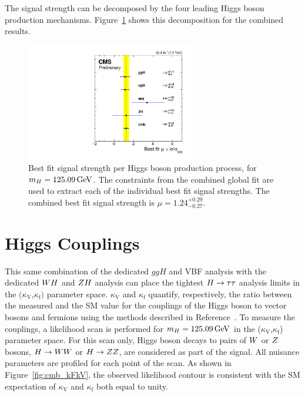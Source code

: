 The signal strength can be decomposed by the four leading Higgs boson production 
mechanisms. Figure~\ref{fig:cmb_mu_higgs_processes} shows this decomposition for
the combined results. 

\begin{figure}[!ht]
 \begin{center}
  \includegraphics[width=0.65\textwidth]{higgs_to_taus_vh/plots/combined/mu_higgs_procs.pdf}
 \end{center}
 \caption{
 Best fit signal strength per Higgs boson production process, for $m_{H} = 125.09\,\mathrm{GeV}$.
 The constraints from the combined global fit are used to extract each of the 
 individual best fit signal strengths. The combined best fit signal strength 
 is $\mu = 1.24 ^{+0.29} _{-0.27}$.
 }
 \label{fig:cmb_mu_higgs_processes}
\end{figure}



\section{Higgs Couplings}
This same combination of the dedicated $ggH$ and VBF analysis with 
the dedicated $WH$ and $ZH$ analysis can place the tightest
$H\to\tau\tau$ analysis limits in the $(\kappa_\text{V}$,$\kappa_\text{f})$ parameter space.
$\kappa_\text{V}$ and $\kappa_\text{f}$ quantify, respectively, 
the ratio between the measured and the SM value for the couplings of the Higgs boson to 
vector bosons and fermions using the methods described in Reference~\cite{Khachatryan:2016vau}.
To measure the couplings, a likelihood scan is performed for $m_{H}=125.09\,\mathrm{GeV}$ in 
the ($\kappa_\text{V}$,$\kappa_\text{f}$) parameter space.
For this scan only, Higgs boson decays to pairs of $W$ or $Z$ bosons, $H\to WW$ or $H\to ZZ$,
are considered as part of the signal. 
All nuisance 
parameters are profiled for each point of the scan. As shown in 
Figure~\ref{fig:cmb_kFkV}, the observed likelihood contour is consistent with the SM expectation 
of $\kappa_\text{V}$ and $\kappa_\text{f}$ both equal to unity.

